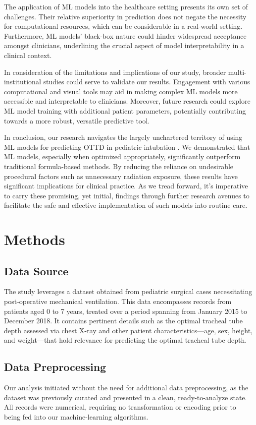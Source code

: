 \documentclass[11pt]{article}
\begin{document}
The application of ML models into the healthcare setting presents its own set of challenges. Their relative superiority in prediction does not negate the necessity for computational resources, which can be considerable in a real-world setting. Furthermore, ML models' black-box nature could hinder widespread acceptance amongst clinicians, underlining the crucial aspect of model interpretability in a clinical context.

In consideration of the limitations and implications of our study, broader multi-institutional studies could serve to validate our results. Engagement with various computational and visual tools may aid in making complex ML models more accessible and interpretable to clinicians. Moreover, future research could explore ML model training with additional patient parameters, potentially contributing towards a more robust, versatile predictive tool.

In conclusion, our research navigates the largely unchartered territory of using ML models for predicting OTTD in pediatric intubation \cite{Meyer2018MachineLF}. We demonstrated that ML models, especially when optimized appropriately, significantly outperform traditional formula-based methods. By reducing the reliance on undesirable procedural factors such as unnecessary radiation exposure, these results have significant implications for clinical practice. As we tread forward, it's imperative to carry these promising, yet initial, findings through further research avenues to facilitate the safe and effective implementation of such models into routine care.

\section*{Methods}

\subsection*{Data Source}
The study leverages a dataset obtained from pediatric surgical cases necessitating post-operative mechanical ventilation. This data encompasses records from patients aged 0 to 7 years, treated over a period spanning from January 2015 to December 2018. It contains pertinent details such as the optimal tracheal tube depth assessed via chest X-ray and other patient characteristics—age, sex, height, and weight—that hold relevance for predicting the optimal tracheal tube depth.

\subsection*{Data Preprocessing}
Our analysis initiated without the need for additional data preprocessing, as the dataset was previously curated and presented in a clean, ready-to-analyze state. All records were numerical, requiring no transformation or encoding prior to being fed into our machine-learning algorithms.
\end{document}
